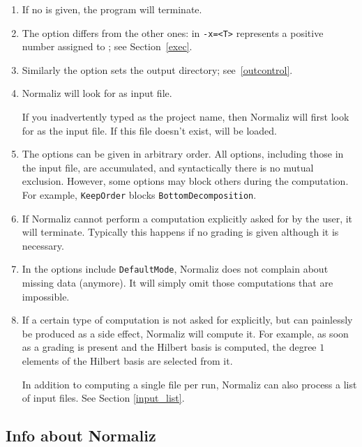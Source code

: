 \begin{enumerate}
	\item If no  is given, the
	program will terminate.
	
	\item The option  differs from the other ones:  in \verb|-x=<T>|
	represents a positive number assigned to ; see
	Section~\ref{exec}.
	
	\item Similarly the option  sets the output directory; see~\ref{outcontrol}.
	
	\item Normaliz will look for  as input
	file.
	
	If you inadvertently typed  as the project
	name, then Normaliz will first look for 
	as the input file. If this file doesn't exist,
	 will be loaded.
	
	\item The options can be given in arbitrary order. All options, including those in the input file, are accumulated, and syntactically there is no mutual exclusion. However, some options may block others during the computation. For example, \verb|KeepOrder| blocks \verb|BottomDecomposition|.
	
	\item If Normaliz cannot perform a computation explicitly asked for by the
	user, it will terminate. Typically this happens if no grading is given although
	it is necessary.
	
	\item In the options include \verb|DefaultMode|, Normaliz does not complain about missing data
	(anymore). It will simply omit those computations that are impossible.
	
	\item If a certain type of computation is not asked for explicitly, but can
	painlessly be produced as a side effect, Normaliz will compute it. For
	example, as soon as a grading is present and the Hilbert basis is computed, the
	degree $1$ elements of the Hilbert basis are selected from it.
	
	In addition to computing a single file per run, Normaliz can also process a list of input files. See Section \ref{input_list}.
	
\end{enumerate}

\subsection{Info about Normaliz}

